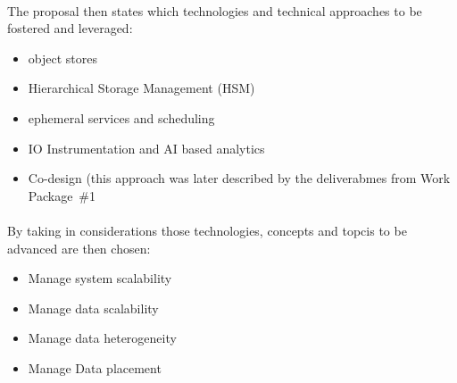 \paragraph{}
The proposal then states which technologies and technical approaches to be fostered and leveraged:
\begin{itemize}
    \item object stores
    \item Hierarchical Storage Management (HSM)
    \item ephemeral services and scheduling
    \item IO Instrumentation and AI based analytics
    \item Co-design (this approach was later described by the deliverabmes from Work Package~\#1
\end{itemize}

\paragraph{}
By taking in considerations those technologies, concepts and topcis to be advanced are then chosen:
\begin{itemize}
    \item Manage system scalability
    \item Manage data scalability
    \item Manage data heterogeneity
    \item Manage Data placement
\end{itemize}

